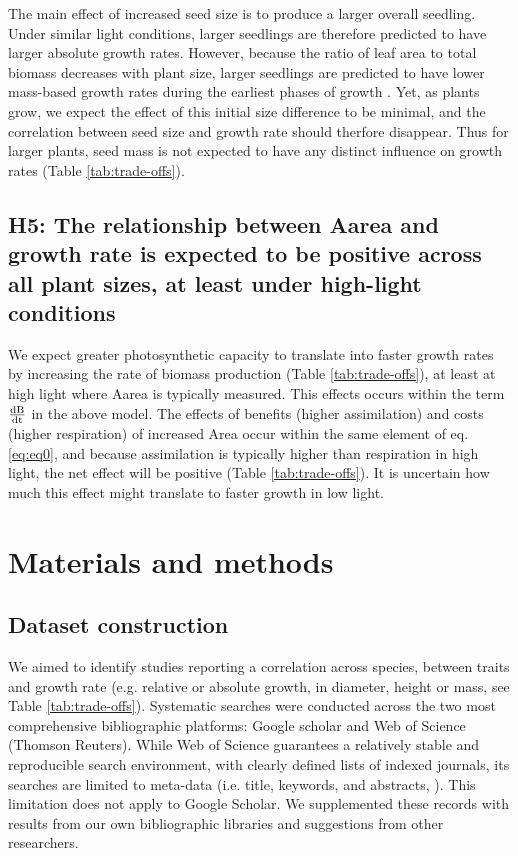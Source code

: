 \documentclass[a4paper,11pt]{article}
\begin{document}
The main effect of increased seed size is to produce a larger overall seedling. Under similar light conditions, larger seedlings are therefore predicted to have larger absolute growth rates. However, because the ratio of leaf area to total biomass decreases with plant size, larger seedlings are predicted to have lower mass-based growth rates during the earliest phases of growth \citep{Turnbull:2012ew}. Yet, as plants grow, we expect the effect of this initial size difference to be minimal, and the correlation between seed size and growth rate should therfore disappear. Thus for larger plants, seed mass is not expected to have any distinct influence on growth rates  (Table \ref{tab:trade-offs}).

\subsection*{H5: The relationship between Aarea and growth rate is expected to be positive across all plant sizes, at least under high-light conditions}

We expect greater photosynthetic capacity to translate into faster growth rates by increasing the rate of biomass production (Table \ref{tab:trade-offs}), at least at high light where Aarea is typically measured. This effects occurs within the term  $\frac{\rm{d} B}{\rm{d} t} $ in the above model. The effects of benefits (higher assimilation) and costs (higher respiration) of increased Area occur within the same element of eq. \ref{eq:eq0}, and because assimilation is typically higher than respiration in high light, the net effect will be positive (Table \ref{tab:trade-offs}). It is uncertain how much this effect might translate to faster growth in low light.

\section*{Materials and methods}\label{material-and-methods}

\subsection*{Dataset construction}\label{data-construction}

We aimed to identify studies reporting a correlation across species, between traits and growth rate (e.g. relative or absolute growth, in diameter, height or mass, see Table \ref{tab:trade-offs}). Systematic searches were conducted across the two most comprehensive bibliographic platforms: Google scholar and Web of Science (Thomson Reuters). While Web of Science guarantees a relatively stable and reproducible search environment, with clearly defined lists of indexed journals, its searches are limited to meta-data (i.e. title, keywords, and abstracts, \citealt{Beckmann:2012hn}). This limitation does not apply to Google Scholar. We supplemented these records with results from our own bibliographic libraries and suggestions from other researchers. 
\end{document}
